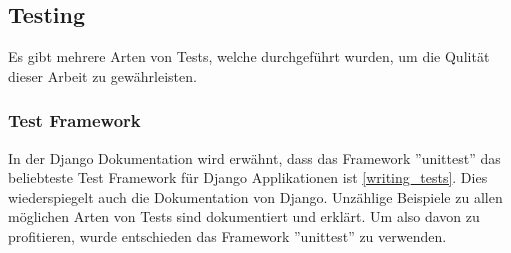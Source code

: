 %


\subsection{Testing}
Es gibt mehrere Arten von Tests, welche durchgeführt wurden, um die Qulität dieser Arbeit zu gewährleisten.

\subsubsection*{Test Framework}
In der Django Dokumentation wird erwähnt, dass das Framework ''unittest'' das beliebteste Test Framework für Django Applikationen ist \ref{writing_tests}. Dies wiederspiegelt auch die Dokumentation von Django. Unzählige Beispiele zu allen möglichen Arten von Tests sind dokumentiert und erklärt. Um also davon zu profitieren, wurde entschieden das Framework ''unittest'' zu verwenden.

